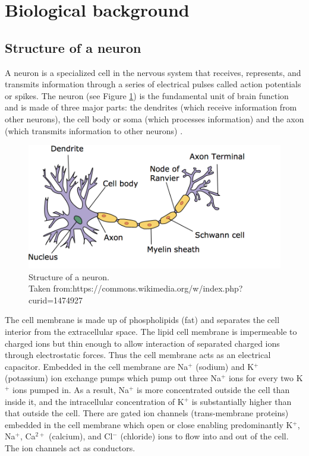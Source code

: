 \section{Biological background}
\subsection{Structure of a neuron}
A neuron is a specialized cell in the nervous system that receives, represents, and transmits information through a series of electrical pulses called action potentials or spikes. The neuron (see Figure \ref{fig:Neuron}) is the fundamental unit of brain function and is made of three major parts: the dendrites (which receive information from other neurons), the cell body or soma (which processes information) and the axon (which transmits information to other neurons) .

\begin{figure}[h]
\centering
\includegraphics[width=\textwidth]{./images/Neuron.png}
\caption{Structure of a neuron.\\
Taken from:https://commons.wikimedia.org/w/index.php?curid=1474927}
      \label{fig:Neuron}
\end{figure}


The cell membrane is made up of phospholipids (fat) and separates the cell interior from the extracellular space. The lipid cell membrane is impermeable
to charged ions but thin enough to allow interaction of separated charged
ions through electrostatic forces. Thus the cell membrane acts as an electrical
capacitor. Embedded in the cell membrane are Na$^{+}$ (sodium) and K$^{+}$ (potassium) ion exchange pumps which pump out three Na$^{+}$ ions for every two K$^{+}$ ions pumped in. As a result, Na$^{+}$ is more concentrated outside the cell than inside it, and the intracellular concentration of K$^{+}$ is substantially higher than that outside the cell. There are gated ion channels
(trans-membrane proteins) embedded in the cell membrane which open or close enabling predominantly K$^{+}$, Na$^{+}$, Ca$^{2+}$ (calcium), and Cl$^{-}$ (chloride) ions to flow into and out of the cell. The ion channels act as conductors.

